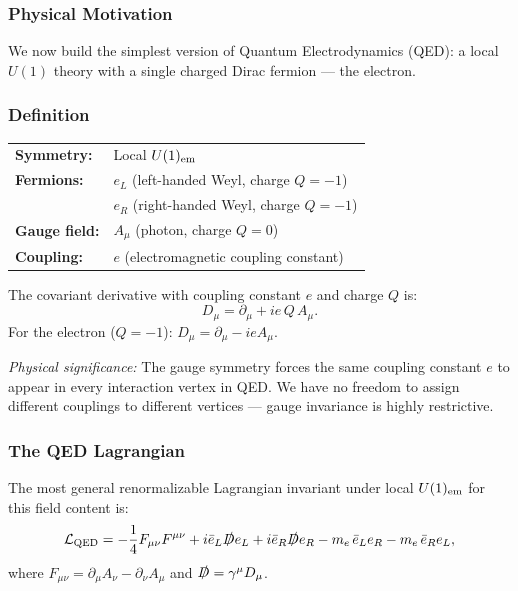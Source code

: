 \documentclass[../main.tex]{subfiles}
\begin{document}
\subsubsection*{Physical Motivation}

We now build the simplest version of Quantum Electrodynamics (QED): a local $U(1)$ theory with a single charged Dirac fermion — the electron.

\subsubsection*{Definition}

\begin{center}
\begin{tabular}{ll}
  \textbf{Symmetry:} & Local $U(1)_{\rm em}$ \\[3pt]
  \textbf{Fermions:} & $e_L$ (left-handed Weyl, charge $Q=-1$) \\
                     & $e_R$ (right-handed Weyl, charge $Q=-1$) \\[3pt]
  \textbf{Gauge field:} & $A_\mu$ (photon, charge $Q=0$) \\[3pt]
  \textbf{Coupling:} & $e$ (electromagnetic coupling constant)
\end{tabular}
\end{center}

\medskip
The covariant derivative with coupling constant $e$ and charge $Q$ is:
\begin{equation}
  \boxed{D_\mu = \partial_\mu + ie\,Q\,A_\mu.}
  \label{eq:lec11:qed-cov-deriv}
\end{equation}
For the electron ($Q=-1$): $D_\mu = \partial_\mu - ie A_\mu$.

\textit{Physical significance:} The gauge symmetry forces the same coupling constant $e$ to appear in every interaction vertex in QED.  We have no freedom to assign different couplings to different vertices — gauge invariance is highly restrictive.

\subsubsection*{The QED Lagrangian}

The most general renormalizable Lagrangian invariant under local $U(1)_{\rm em}$ for this field content is:
\begin{equation}
  \mathcal{L}_{\mathrm{QED}}
  =
  -\frac{1}{4}F_{\mu\nu}F^{\mu\nu}
  + i\bar{e}_L\slashed{D}e_L
  + i\bar{e}_R\slashed{D}e_R
  - m_e\,\bar{e}_L e_R
  - m_e\,\bar{e}_R e_L,
  \label{eq:lec11:qed-lagrangian-weyl}
\end{equation}
where $F_{\mu\nu}=\partial_\mu A_\nu - \partial_\nu A_\mu$ and $\slashed{D}=\gamma^\mu D_\mu$.
\end{document}

